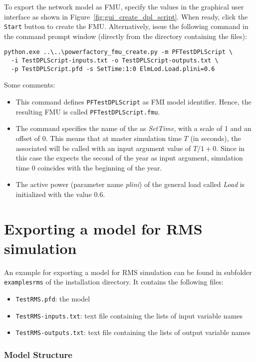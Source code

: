 To export the network model as FMU, specify the values in the graphical user interface as shown in Figure~\ref{fig:gui_create_dpl_script}.
When ready, click the \texttt{Start} button to create the FMU.
Alternatively, issue the following command in the command prompt window (directly from the directory  containing the files):
\begin{verbatim}
python.exe ..\..\powerfactory_fmu_create.py -m PFTestDPLScript \
  -i TestDPLScript-inputs.txt -o TestDPLScript-outputs.txt \
  -p TestDPLScript.pfd -s SetTime:1:0 ElmLod.Load.plini=0.6
\end{verbatim}
Some comments:
\begin{itemize}
  \item This command defines \texttt{PFTestDPLScript} as FMI model identifier.
  Hence, the resulting FMU is called \texttt{PFTestDPLScript.fmu}.
  \item The command specifies the name of the \dplscript as \emph{SetTime}, with a scale of 1 and an offset of 0.
  This means that at master simulation time $T$ (in seconds), the associated \dplscript will be called with an input argument value of $T/1 + 0$.
  Since in this case the \dplscript expects the second of the year as input argument, simulation time 0 coincides with the beginning of the year.
  \item The active power (parameter name \emph{plini}) of the general load called \emph{Load} is initialized with the value $0.6$.
\end{itemize}


\newpage


\section{Exporting a model for RMS simulation}
\label{sec:examples:rmssim}

An example for exporting a model for RMS simulation can be found in subfolder \texttt{examplesrms} of the installation directory.
It contains the following files:
\begin{itemize}
  \item \texttt{TestRMS.pfd}: the \pf model
  \item \texttt{TestRMS-inputs.txt}: text file containing the lists of input variable names
  \item \texttt{TestRMS-outputs.txt}: text file containing the lists of output variable names
\end{itemize}

\subsubsection*{Model Structure}

